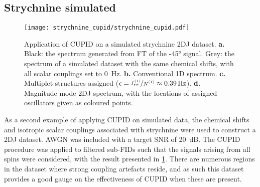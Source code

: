 
\subsection{Strychnine simulated}
\label{subsec:strychnine-cupid}
\begin{figure}
    \centering
    \texttt{[image: strychnine\_cupid/strychnine\_cupid.pdf]}
    \caption[
        Application of \acs{CUPID} on a simulated strychnine \acs{2DJ} dataset.
    ]
    {
        Application of \ac{CUPID} on a simulated strychnine \ac{2DJ} dataset.
        \textbf{a.} Black: the spectrum generated from \ac{FT} of the \ang{-45}
        signal. Grey: the spectrum of a simulated dataset with the same
        chemical shifts, with all scalar couplings set to \qty{0}{\hertz}.
        \textbf{b.} Conventional \ac{1D} spectrum.
        \textbf{c.} Multiplet structures assigned ($\epsilon =
        \nicefrac{\fswone}{\None} \approx \qty{0.39}{\hertz}$).
        \textbf{d.} Magnitude-mode \ac{2DJ} spectrum,
        with the locations of assigned oscillators given as coloured points.
    }
    \label{fig:strychnine-cupid}
\end{figure}
As a second example of applying \ac{CUPID} on simulated data, the chemical
shifts and isotropic scalar couplings associated with strychnine
were used to construct a 2DJ dataset. \ac{AWGN} was included with a target
\ac{SNR} of \qty{20}{\deci\bel}. The CUPID procedure was applied to filtered
sub-FIDs such that the signals arising from all spins were considered, with the
result presented in \cref{fig:strychnine-cupid}. There are numerous
regions in the dataset where strong coupling artefacts reside, and as such this
dataset provides a good gauge on the effectiveness of \ac{CUPID} when these are
present.

